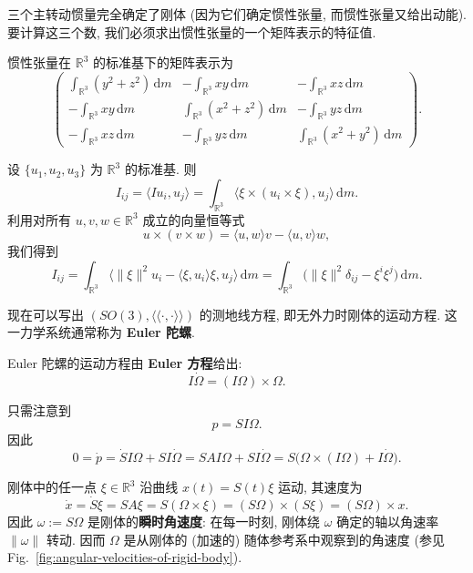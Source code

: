 三个主转动惯量完全确定了刚体 (因为它们确定惯性张量, 而惯性张量又给出动能). 要计算这三个数, 我们必须求出惯性张量的一个矩阵表示的特征值.

\begin{RiemannProposition}\label{prop:inertia-tensor-in-canonical-basis}
惯性张量在 $\mathbb{R}^3$ 的标准基下的矩阵表示为
\[
  \begin{pmatrix}
    \int_{\mathbb{R}^3}(y^2+z^2)\,\mathrm{d}m & -\int_{\mathbb{R}^3}xy\,\mathrm{d}m & -\int_{\mathbb{R}^3}xz\,\mathrm{d}m\\[.4ex]
    -\int_{\mathbb{R}^3}xy\,\mathrm{d}m & \int_{\mathbb{R}^3}(x^2+z^2)\,\mathrm{d}m & -\int_{\mathbb{R}^3}yz\,\mathrm{d}m\\[.4ex]
    -\int_{\mathbb{R}^3}xz\,\mathrm{d}m & -\int_{\mathbb{R}^3}yz\,\mathrm{d}m & \int_{\mathbb{R}^3}(x^2+y^2)\,\mathrm{d}m
  \end{pmatrix}.
\]
\end{RiemannProposition}

\begin{RiemannProof}
设 $\{u_1,u_2,u_3\}$ 为 $\mathbb{R}^3$ 的标准基. 则
\[
  I_{ij}=\langle Iu_i,u_j\rangle
  =\int_{\mathbb{R}^3}\langle\xi\times(u_i\times\xi),u_j\rangle\,\mathrm{d}m.
\]
利用对所有 $u,v,w\in\mathbb{R}^3$ 成立的向量恒等式
\[
  u\times(v\times w)=\langle u,w\rangle v-\langle u,v\rangle w,
\]
我们得到
\[
  I_{ij}=\int_{\mathbb{R}^3}\langle\|\xi\|^2u_i-\langle\xi,u_i\rangle\xi,u_j\rangle\,\mathrm{d}m
  =\int_{\mathbb{R}^3}\bigl(\|\xi\|^2\delta_{ij}-\xi^i\xi^j\bigr)\,\mathrm{d}m.
\]
\end{RiemannProof}

现在可以写出 $(SO(3),\langle\!\langle\cdot,\cdot\rangle\!\rangle)$ 的测地线方程, 即无外力时刚体的运动方程. 这一力学系统通常称为 \textbf{Euler 陀螺}.

\begin{RiemannProposition}\label{prop:euler-equations-of-free-rigid-body}
Euler 陀螺的运动方程由 \textbf{Euler 方程}给出:
\[
  I\dot\Omega=(I\Omega)\times\Omega.
\]
\end{RiemannProposition}

\begin{RiemannProof}
只需注意到
\[
  p=SI\Omega.
\]
因此
\[
  0=\dot p=\dot S I\Omega+SI\dot\Omega
  =SAI\Omega+SI\dot\Omega=S\bigl(\Omega\times(I\Omega)+I\dot\Omega\bigr).
\]
\end{RiemannProof}

\begin{RiemannRemark}\label{rem:angular-velocity-of-rigid-body}
刚体中的任一点 $\xi\in\mathbb{R}^3$ 沿曲线 $x(t)=S(t)\xi$ 运动, 其速度为
\[
  \dot x=\dot S\xi=SA\xi=S(\Omega\times\xi)=(S\Omega)\times(S\xi)=(S\Omega)\times x.
\]
因此 $\omega:=S\Omega$ 是刚体的\textbf{瞬时角速度}: 在每一时刻, 刚体绕 $\omega$ 确定的轴以角速率 $\|\omega\|$ 转动. 因而 $\Omega$ 是从刚体的 (加速的) 随体参考系中观察到的角速度 (参见 Fig.~\ref{fig:angular-velocities-of-rigid-body}).
\end{RiemannRemark}

